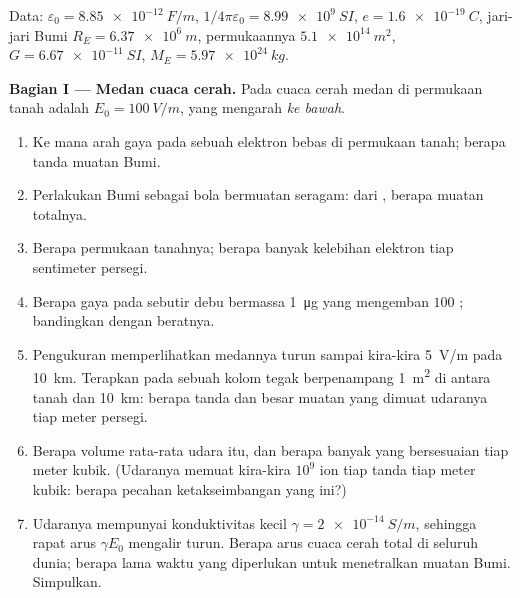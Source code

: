 \begin{problem}
\label{pb:b1:electrostatics-gauss:1}
Data: $\varepsilon_0 = \qty{8.85e-12}{F/m}$, $1/4\pi\varepsilon_0 = \qty{8.99e9}{SI}$,
$e = \qty{1.6e-19}{C}$, jari-jari Bumi $R_E = \qty{6.37e6}{m}$, permukaannya
$\qty{5.1e14}{m^2}$, $G = \qty{6.67e-11}{SI}$, $M_E = \qty{5.97e24}{kg}$.

\medskip
\noindent\textbf{Bagian I --- Medan cuaca cerah.}
Pada cuaca cerah medan di permukaan tanah adalah $E_0 = \qty{100}{V/m}$,
yang mengarah \emph{ke bawah}.
\begin{enumerate}
  \item Ke mana arah gaya pada sebuah elektron bebas di permukaan tanah; berapa tanda
        muatan Bumi.
  \item Perlakukan Bumi sebagai bola bermuatan seragam: dari ,
        berapa muatan totalnya.
  \item Berapa  permukaan tanahnya; berapa banyak kelebihan elektron
        tiap sentimeter persegi.
  \item Berapa gaya pada sebutir debu bermassa \qty{1}{\micro g} yang mengemban $100$
        ; bandingkan dengan beratnya.
  \item Pengukuran memperlihatkan medannya turun sampai kira-kira \qty{5}{V/m} pada
        \qty{10}{km}. Terapkan  pada sebuah kolom tegak berpenampang
        \qty{1}{m^2} di antara tanah dan \qty{10}{km}: berapa tanda
        dan besar muatan yang dimuat udaranya tiap meter persegi.
  \item Berapa  volume rata-rata udara itu, dan berapa
        banyak  yang bersesuaian tiap meter kubik. (Udaranya memuat
        kira-kira $10^9$ ion tiap tanda tiap meter kubik: berapa pecahan
        ketakseimbangan yang ini?)
  \item Udaranya mempunyai konduktivitas kecil $\gamma = \qty{2e-14}{S/m}$, sehingga
        rapat arus $\gamma E_0$ mengalir turun. Berapa arus cuaca cerah
        total di seluruh dunia; berapa lama waktu yang diperlukan untuk menetralkan
        muatan Bumi. Simpulkan.
\end{enumerate}


\end{problem}
